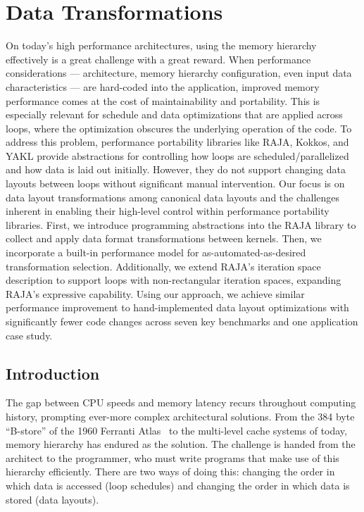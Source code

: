 
\chapter{Data Transformations}\label{chap:FormatDecisions}

\def\@textbottom{\vskip \z@ \@plus 1pt}


On today's high performance architectures, using the memory hierarchy effectively is a great challenge with a great reward.
When performance considerations --- architecture, memory hierarchy configuration, even input data characteristics --- are hard-coded into the application, improved memory performance comes at the cost of maintainability and portability. 
This is especially relevant for schedule and data optimizations that are applied across loops, where the optimization obscures the underlying operation of the code.
To address this problem, performance portability libraries like RAJA, Kokkos, and YAKL provide abstractions for controlling how loops are scheduled/parallelized and how data is laid out initially.
However, they do not support changing data layouts between loops without significant manual intervention.
Our focus is on data layout transformations among canonical data layouts and the challenges inherent in enabling their high-level control within performance portability libraries.
First, we introduce programming abstractions into the RAJA library to collect and apply data format transformations between kernels.
Then, we incorporate a built-in performance model for as-automated-as-desired transformation selection.
Additionally, we extend RAJA's iteration space description to support loops with non-rectangular iteration spaces, expanding RAJA's expressive capability.
Using our approach, we achieve similar performance improvement to hand-implemented data layout optimizations with significantly fewer code changes across seven key benchmarks and one application case study.
\section{Introduction}

The gap between CPU speeds and memory latency recurs throughout computing history, prompting ever-more complex architectural solutions.
From the 384 byte ``B-store'' of the 1960 Ferranti Atlas~\cite{ferranti1960features} to the multi-level cache systems of today, memory hierarchy has endured as the solution.
The challenge is handed from the architect to the programmer, who must write programs that make use of this hierarchy efficiently.
There are two ways of doing this: changing the order in which data is accessed (loop schedules) and changing the order in which data is stored (data layouts).

